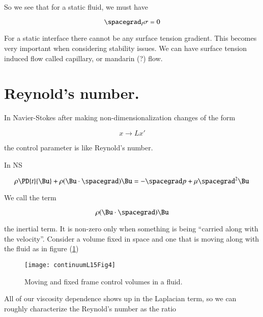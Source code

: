 So we see that for a static fluid, we must have

\begin{equation}\label{eqn:inclinedFlowWithoutConstantHeightAssumption:110}
\spacegrad_I \sigma = 0
\end{equation}

For a static interface there cannot be any surface tension gradient.  This becomes very important when considering stability issues.  We can have surface tension induced flow called capillary, or mandarin (?) flow.

\section{Reynold's number.}

In Navier-Stokes after making non-dimensionalization changes of the form

\begin{equation}\label{eqn:inclinedFlowWithoutConstantHeightAssumption:150}
x \rightarrow L x'
\end{equation}

the control parameter is like Reynold's number.

In NS

\begin{equation}\label{eqn:inclinedFlowWithoutConstantHeightAssumption:170}
\rho \PD{t}{\Bu} + \rho ( \Bu \cdot \spacegrad ) \Bu = - \spacegrad p + \mu \spacegrad^2 \Bu
\end{equation}

We call the term

\begin{equation}\label{eqn:inclinedFlowWithoutConstantHeightAssumption:190}
\rho ( \Bu \cdot \spacegrad ) \Bu
\end{equation}

the inertial term.  It is non-zero only when something is being ``carried along with the velocity''.  Consider a volume fixed in space and one that is moving along with the fluid as in figure (\ref{fig:continuumL15:continuumL15Fig4})
\begin{figure}[htp]
   \centering
   \texttt{[image: continuumL15Fig4]}
   \caption{Moving and fixed frame control volumes in a fluid.}\label{fig:continuumL15:continuumL15Fig4}
\end{figure}

All of our viscosity dependence shows up in the Laplacian term, so we can roughly characterize the Reynold's number as the ratio

